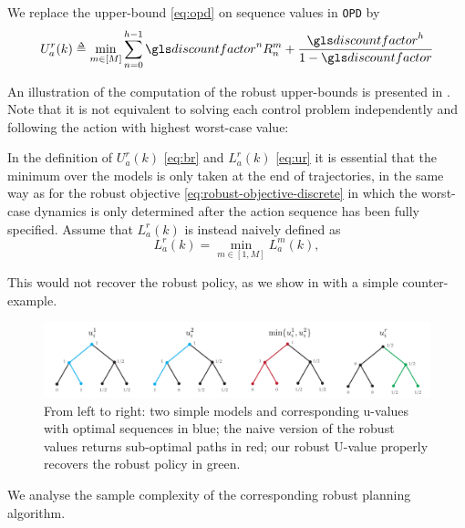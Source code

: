 \begin{definition}
	\begin{leftbar}[defnbar]
	We replace the upper-bound \eqref{eq:opd} on sequence values in \texttt{OPD} by
	\begin{equation}
	\label{eq:robust-b-values}
	U_a^r(k)  \eqdef \min_{m\in[M]} \sum_{n=0}^{h-1} \discount^n R_n^m  + \frac{\discount^h}{1-\discount}
	\end{equation}
	\end{leftbar}
\end{definition}
An illustration of the computation of the robust upper-bounds is presented in . 
Note that it is not equivalent to solving each control problem independently and following the action with highest worst-case value:
\begin{remark}
	\label{sec:min-max-order}
	\begin{leftbar}[remarkbar]
	In the definition of $U_{a}^{r}(k)$ \eqref{eq:br} and $L_{a}^{r}(k)$ \eqref{eq:ur} it is essential that the minimum over the models is only taken at the end of trajectories, in the same way as for the robust objective \eqref{eq:robust-objective-discrete} in which the worst-case dynamics is only determined after the action sequence has been fully specified. Assume that $L_{a}^{r}(k)$ is instead naively defined as
	\[
	L_{a}^{r}(k)=\min_{m\in[1,M]}L_{a}^{m}(k),
	\]
	
	This would not recover the robust policy, as we show in  with a simple counter-example.
\end{leftbar}
	\begin{figure}[htp]
	\centering
	\includegraphics[width=\linewidth]{img/min-max-order}
	\caption{From left to right: two simple models and corresponding u-values with optimal sequences in blue; the naive version of the robust values returns sub-optimal paths in red; our robust U-value properly recovers the robust policy in green.}
	\label{fig:min-max-order}
	\end{figure}
\end{remark}

We analyse the sample complexity of the corresponding robust planning algorithm.

